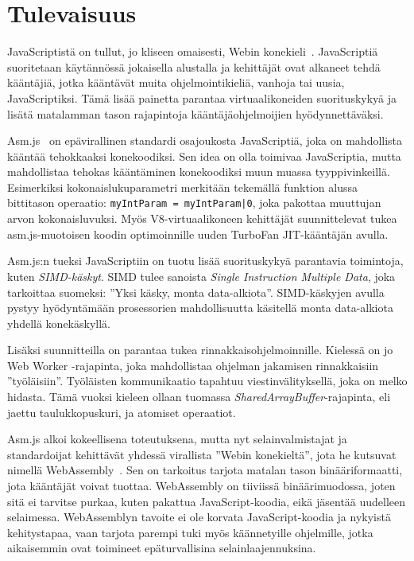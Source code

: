 \section{Tulevaisuus}

JavaScriptistä on tullut, jo kliseen omaisesti, Webin konekieli~\cite{webassembly}. JavaScriptiä suoritetaan käytännössä jokaisella alustalla ja kehittäjät ovat alkaneet tehdä kääntäjiä, jotka kääntävät muita ohjelmointikieliä, vanhoja tai uusia, JavaScriptiksi. Tämä lisää painetta parantaa virtuaalikoneiden suorituskykyä ja lisätä matalamman tason rajapintoja kääntäjäohjelmoijien hyödynnettäväksi.

Asm.js~\cite{asmjs} on epävirallinen standardi osajoukosta JavaScriptiä, joka on mahdollista kääntää tehokkaaksi konekoodiksi. Sen idea on olla toimivaa JavaScriptia, mutta mahdollistaa tehokas kääntäminen konekoodiksi muun muassa tyyppivinkeillä. Esimerkiksi kokonaislukuparametri merkitään tekemällä funktion alussa bittitason operaatio: \texttt{myIntParam = myIntParam|0}, joka pakottaa muuttujan arvon kokonaisluvuksi. Myös V8-virtuaalikoneen kehittäjät suunnittelevat tukea asm.js-muotoisen koodin optimoinnille uuden TurboFan JIT-kääntäjän avulla.

Asm.js:n tueksi JavaScriptiin on tuotu lisää suorituskykyä parantavia toimintoja, kuten \textit{SIMD-käskyt}. SIMD tulee sanoista \textit{Single Instruction Multiple Data}, joka tarkoittaa suomeksi: ''Yksi käsky, monta data-alkiota''. SIMD-käskyjen avulla pystyy hyödyntämään prosessorien mahdollisuutta käsitellä monta data-alkiota yhdellä konekäskyllä.

Lisäksi suunnitteilla on parantaa tukea rinnakkaisohjelmoinnille. Kielessä on jo Web Worker -rajapinta, joka mahdollistaa ohjelman jakamisen rinnakkaisiin ''työläisiin''. Työläisten kommunikaatio tapahtuu viestinvälityksellä, joka on melko hidasta. Tämä vuoksi kieleen ollaan tuomassa \textit{SharedArrayBuffer}-rajapinta, eli jaettu taulukkopuskuri, ja atomiset operaatiot.

Asm.js alkoi kokeellisena toteutuksena, mutta nyt selainvalmistajat ja standardoijat kehittävät yhdessä virallista ''Webin konekieltä'', jota he kutsuvat nimellä WebAssembly~\cite{webassembly}. Sen on tarkoitus tarjota matalan tason binääriformaatti, jota kääntäjät voivat tuottaa. WebAssembly on tiiviissä binäärimuodossa, joten sitä ei tarvitse purkaa, kuten pakattua JavaScript-koodia, eikä jäsentää uudelleen selaimessa. WebAssemblyn tavoite ei ole korvata JavaScript-koodia ja nykyistä kehitystapaa, vaan tarjota parempi tuki myös käännetyille ohjelmille, jotka aikaisemmin ovat toimineet epäturvallisina selainlaajennuksina.

